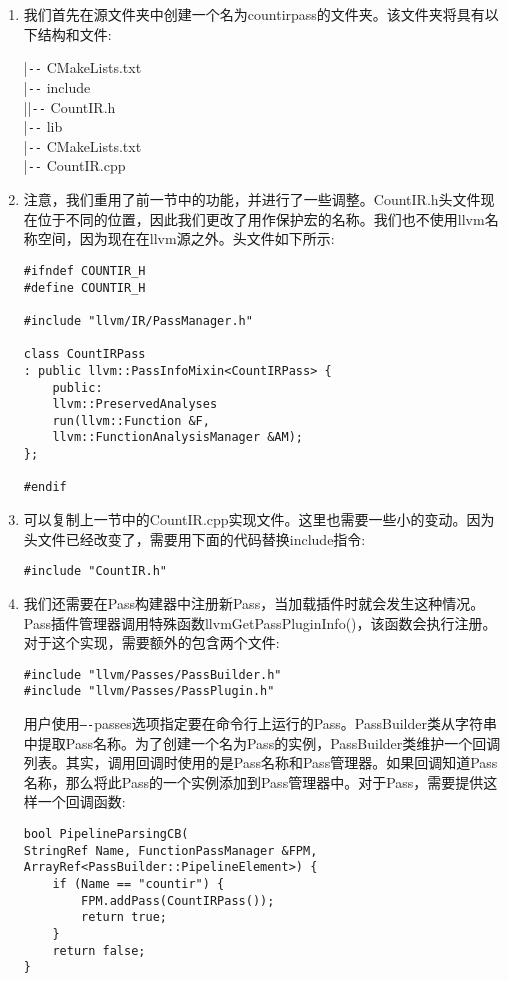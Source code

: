 \begin{enumerate}
\item 我们首先在源文件夹中创建一个名为countirpass的文件夹。该文件夹将具有以下结构和文件:
\begin{tcolorbox}[colback=white,colframe=black]
|\verb|--| CMakeLists.txt \\
|\verb|--| include \\
|\hspace{1cm}|\verb|--| CountIR.h \\
|\verb|--| lib \\
\hspace*{0.8cm}|\verb|--| CMakeLists.txt \\
\hspace*{0.8cm}|\verb|--| CountIR.cpp
\end{tcolorbox}
	
\item 注意，我们重用了前一节中的功能，并进行了一些调整。CountIR.h头文件现在位于不同的位置，因此我们更改了用作保护宏的名称。我们也不使用llvm名称空间，因为现在在llvm源之外。头文件如下所示:
\begin{lstlisting}[caption={}]
#ifndef COUNTIR_H
#define COUNTIR_H

#include "llvm/IR/PassManager.h"

class CountIRPass
: public llvm::PassInfoMixin<CountIRPass> {
	public:
	llvm::PreservedAnalyses
	run(llvm::Function &F,
	llvm::FunctionAnalysisManager &AM);
};

#endif
\end{lstlisting}
	
\item 可以复制上一节中的CountIR.cpp实现文件。这里也需要一些小的变动。因为头文件已经改变了，需要用下面的代码替换include指令:
\begin{lstlisting}[caption={}]
#include "CountIR.h"
\end{lstlisting}
	
\item 我们还需要在Pass构建器中注册新Pass，当加载插件时就会发生这种情况。Pass插件管理器调用特殊函数llvmGetPassPluginInfo()，该函数会执行注册。对于这个实现，需要额外的包含两个文件:
\begin{lstlisting}[caption={}]
#include "llvm/Passes/PassBuilder.h"
#include "llvm/Passes/PassPlugin.h"
\end{lstlisting}
用户使用\verb|–-|passes选项指定要在命令行上运行的Pass。PassBuilder类从字符串中提取Pass名称。为了创建一个名为Pass的实例，PassBuilder类维护一个回调列表。其实，调用回调时使用的是Pass名称和Pass管理器。如果回调知道Pass名称，那么将此Pass的一个实例添加到Pass管理器中。对于Pass，需要提供这样一个回调函数:
\begin{lstlisting}[caption={}]
bool PipelineParsingCB(
StringRef Name, FunctionPassManager &FPM,
ArrayRef<PassBuilder::PipelineElement>) {
	if (Name == "countir") {
		FPM.addPass(CountIRPass());
		return true;
	}
	return false;
}
\end{lstlisting}
	

\end{enumerate}
